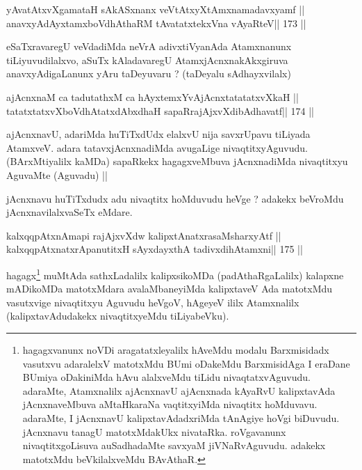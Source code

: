 \begin{shl}
yAvatAtxvXgamataH sAkASxnanx veVtAtxyXtAmxnamadavxyamf ||
anavxyAdAyxtamxboVdhAthaRM tAvatatxtekxVna vAyaRteV\hfill || 173 ||
\end{shl}

\begin{artha}
eSaTxravaregU veVdadiMda neVrA adivxtiVyanAda Atamxnanunx tiLiyuvudilalxvo, aSuTx kAladavaregU AtamxjAcnxnakAkxgiruva anavxyAdigaLanunx yAru taDeyuvaru ? (taDeyalu sAdhayxvilalx)
\end{artha}

\begin{shl}
ajAcnxnaM ca tadutathxM ca hAyxtemxYvAjAcnxtatatatxvXkaH ||
tatatxtatxvXboVdhAtatxdAbxdhaH sapaRrajAjxvXdibAdhavatf\hfill || 174 ||
\end{shl}

\begin{artha}
ajAcnxnavU, adariMda huTiTxdUdx elalxvU nija savxrUpavu tiLiyada 
AtamxveV. adara tatavxjAcnxnadiMda avugaLige nivaqtitxyAguvudu. 
(BArxMtiyalilx kaMDa) sapaRkekx hagagxveMbuva jAcnxnadiMda nivaqtitxyu 
AguvaMte (Aguvadu) ||
\end{artha}

\begin{artha}
jAcnxnavu huTiTxdudx adu nivaqtitx hoMduvudu heVge ? adakekx beVroMdu jAcnxnavilalxvaSeTx eMdare.
\end{artha}

\begin{shl}
kalxqqpAtxnAmapi rajAjxvXdw kalipxtAnatxrasaMsharxyAtf ||
kalxqqpAtxnatxrApanutitxH sAyxdayxthA tadivxdihA\s\s tamxni\hfill || 175 ||
\end{shl}

\begin{artha}
hagagx\footnote[12]{hagagxvanunx noVDi aragatatxleyalilx hAveMdu modalu 
Barxmisidadx vasutxvu adaralelxV matotxMdu BUmi oDakeMdu BarxmisidAga I 
eraDane BUmiya oDakiniMda hAvu alalxveMdu tiLidu nivaqtatxvAguvudu. 
adaraMte, Atamxnalilx ajAcnxnavU ajAcnxnada kAyaRvU kalipxtavAda 
jAcnxnaveMbuva aMtaHkaraNa vaqtitxyiMda nivaqtitx hoMduvavu. adaraMte, 
I jAcnxnavU kalipxtavAdadxriMda tAnAgiye hoVgi biDuvudu. jAcnxnavu tanagU matotxMdakUkx nivataRka. roVgavanunx nivaqtitxgoLisuva auSadhadaMte savxyaM jiVNaRvAguvudu. adakekx matotxMdu beVkilalxveMdu BAvAthaR.} muMtAda sathxLadalilx kalipxsikoMDa (padAthaRgaLalilx) kalapxne mADikoMDa matotxMdara avalaMbaneyiMda kalipxtaveV Ada matotxMdu vasutxvige nivaqtitxyu Aguvudu heVgoV, hAgeyeV ililx Atamxnalilx (kalipxtavAdudakekx nivaqtitxyeMdu tiLiyabeVku).
\end{artha}

